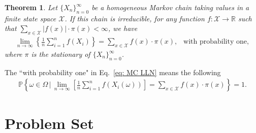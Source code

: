 \documentclass[11pt,letterpaper, leqno]{article}
\newtheorem{theorem}{Theorem}
\numberwithin{equation}{section}
\numberwithin{theorem}{section}
\numberwithin{lemma}{section}
\numberwithin{corollary}{section}
\numberwithin{definition}{section}
\numberwithin{proposition}{section}
\numberwithin{remark}{section}
\numberwithin{example}{section}
\begin{document}
\begin{theorem}\label{thm: theoretical foundation for MCMC task 2}
Let $\{X_n\}_{n=0}^\infty$ be a homogeneous Markov chain taking values in a finite state space $\mathcal{X}$. If this chain is irreducible, for any function $f:\mathcal{X}\rightarrow\mathbb{R}$ such that $\sum_{x\in\mathcal{X}} \vert f(x)\vert\cdot\pi(x) <\infty$, we have
\begin{align}\label{eq: MC LLN}
    \lim_{n\rightarrow\infty}\left\{\frac{1}{n}\sum_{i=1}^n f(X_i) \right\}=\sum_{x\in\mathcal{X}}f(x)\cdot\pi(x),\ \ \mbox{ with probability one},
\end{align}
where $\pi$ is the stationary of $\{X_n\}_{n=0}^\infty$.
\end{theorem}
\noindent The ``with probability one" in Eq.~\eqref{eq: MC LLN} means the following
    \begin{align*}
        \mathbb{P}\left\{\omega\in\Omega \,\Bigg\vert\, \lim_{n\rightarrow\infty}\left[\frac{1}{n}\sum_{i=1}^n f\left(X_i(\omega)\right) \right]=\sum_{x\in\mathcal{X}}f(x)\cdot\pi(x)\right\}=1.
    \end{align*}


\pagebreak
\section{Problem Set}
\end{document}
